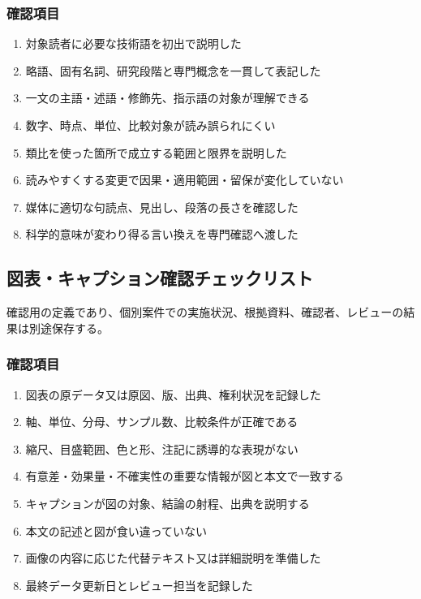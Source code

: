 \documentclass[a4paper,11pt]{article}
\begin{document}
\subsubsection*{確認項目}
\begin{enumerate}[leftmargin=2em,itemsep=0.3em]
\item 対象読者に必要な技術語を初出で説明した\par
\item 略語、固有名詞、研究段階と専門概念を一貫して表記した\par
\item 一文の主語・述語・修飾先、指示語の対象が理解できる\par
\item 数字、時点、単位、比較対象が読み誤られにくい\par
\item 類比を使った箇所で成立する範囲と限界を説明した\par
\item 読みやすくする変更で因果・適用範囲・留保が変化していない\par
\item 媒体に適切な句読点、見出し、段落の長さを確認した\par
\item 科学的意味が変わり得る言い換えを専門確認へ渡した\par
\end{enumerate}
\subsection{図表・キャプション確認チェックリスト}
\par 確認用の定義であり、個別案件での実施状況、根拠資料、確認者、レビューの結果は別途保存する。\par\medskip
\subsubsection*{確認項目}
\begin{enumerate}[leftmargin=2em,itemsep=0.3em]
\item 図表の原データ又は原図、版、出典、権利状況を記録した\par
\item 軸、単位、分母、サンプル数、比較条件が正確である\par
\item 縮尺、目盛範囲、色と形、注記に誘導的な表現がない\par
\item 有意差・効果量・不確実性の重要な情報が図と本文で一致する\par
\item キャプションが図の対象、結論の射程、出典を説明する\par
\item 本文の記述と図が食い違っていない\par
\item 画像の内容に応じた代替テキスト又は詳細説明を準備した\par
\item 最終データ更新日とレビュー担当を記録した\par
\end{enumerate}
\end{document}
